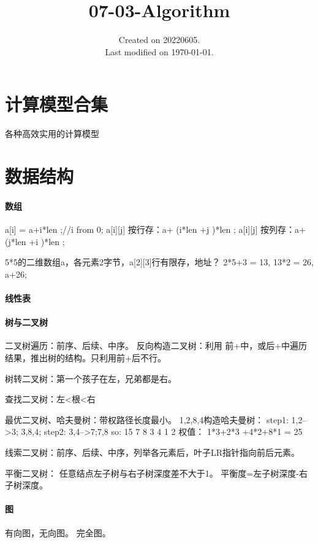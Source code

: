 \documentclass[UTF8]{../computerUniverse}
\begin{document}
\title{07-03-Algorithm}
\date{Created on 20220605.\\   Last modified on \today.}
\maketitle
\tableofcontents








\chapter{计算模型合集}
各种高效实用的计算模型

\chapter{数据结构}


\subsubsection{数组}
 a[i] = a+i*len ;//i from 0;
 a[i][j]  按行存：a+ (i*len +j )*len ;
 a[i][j]  按列存：a+ (j*len +i )*len ;

 5*5的二维数组a，各元素2字节，a[2][3]行有限存，地址？
 2*5+3 = 13, 13*2 = 26, a+26;
\subsubsection{线性表}

\subsubsection{树与二叉树}

二叉树遍历：前序、后续、中序。
反向构造二叉树：利用 前+中，或后+中遍历结果，推出树的结构。只利用前+后不行。

树转二叉树：第一个孩子在左，兄弟都是右。

查找二叉树：左<根<右


最优二叉树、哈夫曼树：带权路径长度最小。 
1,2,8,4构造哈夫曼树：
step1: 1,2-->3; 3,8,4;
step2: 3,4-->7;7,8
so:        15
      7       8
   3    4
1    2
权值： 1*3+2*3 +4*2+8*1 = 25

线索二叉树：前序、后续、中序，列举各元素后，叶子LR指针指向前后元素。

平衡二叉树：
任意结点左子树与右子树深度差不大于1。
平衡度=左子树深度-右子树深度。


\subsubsection{图}
有向图，无向图。
完全图。
\end{document}
